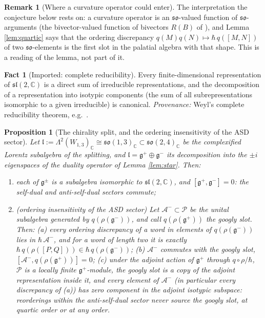 \documentclass[11pt]{article}
\newtheorem{proposition}[theorem]{Proposition}
\theoremstyle{definition}
\newtheorem{remark}[theorem]{Remark}
\newtheorem{fact}[theorem]{Fact}
\newcommand{\C}{\mathbb{C}}
\begin{document}
\begin{remark}[Where a curvature operator could enter]\label{rem:receptacle}
The interpretation the conjecture below rests on: a curvature operator is an $\mathfrak{so}$-valued function of $\mathfrak{so}$-arguments (the bivector-valued function of bivectors $R(B)$ of \cite{ButlerT6}), and Lemma \ref{lem:quartic} says that the ordering discrepancy $q(M)q(N) \mapsto \hbar\,q([M,N])$ of two $\mathfrak{so}$-elements is the first slot in the palatial algebra with that shape. This is a reading of the lemma, not part of it.
\end{remark}

\begin{fact}[Imported: complete reducibility]\label{fact:reducibility}
Every finite-dimensional representation of $\mathfrak{sl}(2,\C)$ is a direct sum of irreducible representations, and the decomposition of a representation into isotypic components (the sum of all subrepresentations isomorphic to a given irreducible) is canonical. \emph{Provenance:} Weyl's complete reducibility theorem, e.g.\ \cite[\S6.3, \S7]{Humphreys72}.
\end{fact}

\begin{proposition}[The chirality split, and the ordering insensitivity of the ASD sector]\label{prop:blind}
Let $\mathfrak{l} := \Lambda^2 (W_{1,3})_\C \cong \mathfrak{so}(1,3)_\C \subset \mathfrak{so}(2,4)_\C$ be the complexified Lorentz subalgebra of the splitting, and $\mathfrak{l} = \mathfrak{g}^+ \oplus \mathfrak{g}^-$ its decomposition into the $\pm i$ eigenspaces of the duality operator of Lemma \ref{lem:star}. Then:
\begin{enumerate}
\item each of $\mathfrak{g}^\pm$ is a subalgebra isomorphic to $\mathfrak{sl}(2,\C)$, and $[\mathfrak{g}^+, \mathfrak{g}^-] = 0$: the self-dual and anti-self-dual sectors commute;
\item (\emph{ordering insensitivity of the ASD sector}) Let $\mathcal{A}^- \subset \mathcal{P}$ be the unital subalgebra generated by $q(\rho(\mathfrak{g}^-))$, and call $q(\rho(\mathfrak{g}^+))$ the \emph{googly slot}. Then: (a) every ordering discrepancy of a word in elements of $q(\rho(\mathfrak{g}^-))$ lies in $\hbar\,\mathcal{A}^-$, and for a word of length two it is exactly $\hbar\,q(\rho([P, Q])) \in \hbar\,q(\rho(\mathfrak{g}^-))$; (b) $\mathcal{A}^-$ commutes with the googly slot, $[\mathcal{A}^-, q(\rho(\mathfrak{g}^+))] = 0$; (c) under the adjoint action of $\mathfrak{g}^+$ through $q\circ\rho/\hbar$, $\mathcal{P}$ is a locally finite $\mathfrak{g}^+$-module, the googly slot is a copy of the adjoint representation inside it, and every element of $\mathcal{A}^-$ (in particular every discrepancy of (a)) has zero component in the adjoint isotypic subspace: reorderings within the anti-self-dual sector never source the googly slot, at quartic order or at any order.
\end{enumerate}
\end{proposition}
\end{document}
